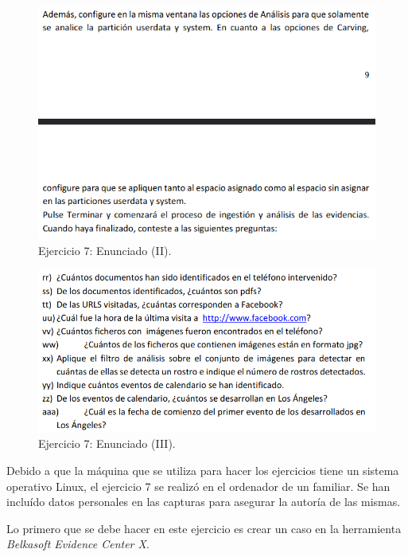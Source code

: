 \documentclass[11pt]{article}
\begin{document}
\begin{figure}[H]
    \caption{Ejercicio 7: Enunciado (II).}
  \centering
  \includegraphics[scale=0.7]{other/enunciado_p04_e7-2.png}
\end{figure}

\begin{figure}[H]
    \caption{Ejercicio 7: Enunciado (III).}
  \centering
  \includegraphics[scale=0.7]{other/enunciado_p04_e7-3.png}
\end{figure}

Debido a que la máquina que se utiliza para hacer los ejercicios tiene un sistema operativo Linux, el ejercicio 7 se realizó en el ordenador de un familiar. Se han incluído datos personales en las capturas para asegurar la autoría de las mismas.

Lo primero que se debe hacer en este ejercicio es crear un caso en la herramienta \textit{Belkasoft Evidence Center X}.
\end{document}
